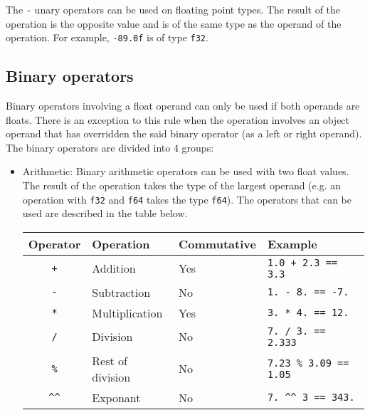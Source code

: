 The \texttt{-} unary operators can be used on floating point types. The result
of the operation is the opposite value and is of the same type as the operand of
the operation. For example, \texttt{-89.0f} is of type \texttt{f32}.

\subsection{Binary operators}
\label{sec:orga43d13a}

Binary operators involving a float operand can only be used if both operands are
floats. There is an exception to this rule when the operation involves an object
operand that has overridden the said binary operator (as a left or right
operand). The binary operators are divided into 4 groups:

\begin{itemize}
\item Arithmetic: Binary arithmetic operators can be used with two float values.
  The result of the operation takes the type of the largest operand (e.g. an
  operation with \texttt{f32} and \texttt{f64} takes the type \texttt{f64}). The
  operators that can be used are described in the table below.

  \begin{center}
    \vspace{-20pt}
    \begin{adjustbox}{max width=1.0\linewidth}
      \begin{tabular}{|c|lll|}
        \hline
        Operator & Operation & Commutative & Example\\[0pt]
        \hline
        \hline
        \texttt{+} & Addition & Yes & \texttt{1.0 + 2.3 == 3.3}\\[0pt]
        \texttt{-} & Subtraction & No & \texttt{1. - 8. == -7.}\\[0pt]
        \texttt{*} & Multiplication & Yes & \texttt{3. * 4. == 12.}\\[0pt]
        \texttt{/} & Division & No & \texttt{7. / 3. == 2.333}\\[0pt]
        \texttt{\%} & Rest of division & No & \texttt{7.23 \% 3.09 == 1.05}\\[0pt]
        \texttt{\textasciicircum{}\textasciicircum{}} & Exponant & No & \texttt{7. \textasciicircum{}\textasciicircum{} 3 == 343.}\\[0pt]
        \hline
      \end{tabular}
    \end{adjustbox}
  \end{center}


\end{itemize}

